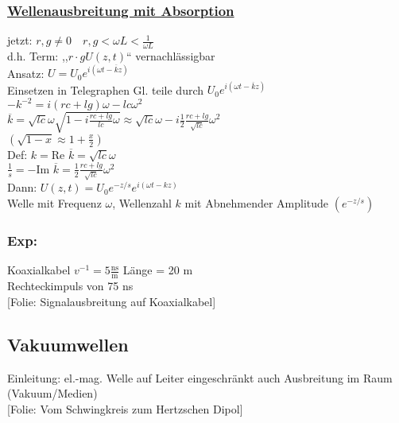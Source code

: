 \documentclass[titlepage,12pt,a4paper,ngerman]{report}
\newcommand{\tx}[1]{\textrm{#1}}
\newcommand{\folie}[1]{\color{gray}[Folie: #1]\color{black}}
\begin{document}
\subsubsection{\underline{Wellenausbreitung mit Absorption}}
jetzt: $ r,g \neq 0 \quad r,g < \omega L < \frac{1}{\omega L} $\\
d.h. Term: ,,$ r\cdot g U(z,t) $`` vernachlässigbar\\
Ansatz: $ U = U_0 e ^{i(\omega t - \overline{k}z)} $\\
Einsetzen in Telegraphen Gl. teile durch $ U_0 e^{i(\omega t - \overline{k} z)} $\\
$ -k^{-2} = i (rc + lg) \omega - lc \omega^2 $\\
$ \overline{k} = \sqrt{lc} \omega \sqrt{1-i\frac{rc+lg}{lc} \omega} \approx \sqrt{lc} \omega - i \frac{1}{2} \frac{rc+lg}{\sqrt{lc}} \omega^2 $\\
$ (\sqrt{1-x} \approx 1+\frac{x}{2}) $\\
Def: $ k = \tx{Re } \overline{k} = \sqrt{lc} \omega $\\
$ \frac{1}{s} = - \tx{Im } \overline{k} = \frac{1}{2} \frac{rc+lg}{\sqrt{lc}} \omega^2 $\\
Dann: $ U(z,t) = U_0e^{-z/s} e^{i(\omega t - kz)} $\\
Welle mit Frequenz $ \omega $, Wellenzahl $ k $ mit Abnehmender Amplitude $ (e^{-z/s}) $
\subsubsection{Exp:}
Koaxialkabel $ v^{-1} = 5 \frac{\tx{ns}}{\tx{m}} $ Länge = 20 m\\
Rechteckimpuls von 75 ns\\
\folie{Signalausbreitung auf Koaxialkabel}

\subsection{Vakuumwellen}
Einleitung: el.-mag. Welle auf Leiter eingeschränkt auch Ausbreitung im Raum (Vakuum/Medien)\\
\folie{Vom Schwingkreis zum Hertzschen Dipol}

\end{document}
